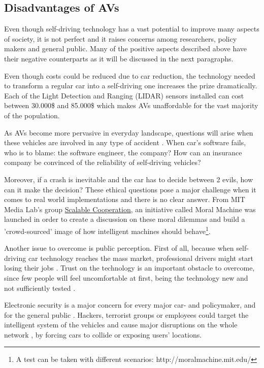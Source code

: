 \subsection{Disadvantages of AVs}

Even though self-driving technology has a vast potential to improve many aspects of society, it is not perfect and it raises concerns among researchers, policy makers and general public. Many of the positive aspects described above have their negative counterparts as it will be discussed in the next paragraphs.

 Even though costs could be reduced due to car reduction, the technology needed to transform a regular car into a self-driving one increases the prize dramatically. Each of the Light Detection and Ranging (LIDAR) sensors installed can cost between 30.000\$ and 85.000\$  which makes AVs unaffordable for the vast majority of the population.  

 As AVs become more pervasive in everyday landscape, questions will arise when these vehicles are involved in any type of accident . When car's software fails, who is to blame: the software engineer, the company? How can an insurance company be convinced of the reliability of self-driving vehicles?

Moreover, if a crash is inevitable and the car has to decide between 2 evils, how can it make the decision? These ethical questions pose a major challenge when it comes to real world implementations and there is no clear answer. From MIT Media Lab's group \href{https://www.media.mit.edu/groups/scalable-cooperation/overview/}{Scalable Cooperation}, an initiative called Moral Machine  was launched in order to create a discussion on these moral dilemmas and build a 'crowd-sourced' image of how intelligent machines should behave\footnote{A test can be taken with different scenarios: http://moralmachine.mit.edu/}.

 Another issue to overcome is public perception. First of all, because when self-driving car technology reaches the mass market, professional drivers might start losing their jobs . Trust on the technology is an important obstacle to overcome, since few people will feel uncomfortable at first, being the technology new and not sufficiently tested . 

 Electronic security is a major concern for every major car- and policymaker, and for the general public . Hackers, terrorist groups or employees could target the intelligent system of the vehicles and cause major disruptions on the whole network , by forcing cars to collide or exposing users' locations.

